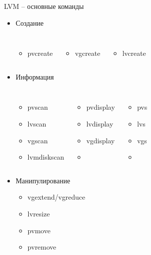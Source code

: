 \begin{frame}{LVM -- основные команды}
  \begin{itemize}
    \item Создание
      \begin{columns}
        \begin{itemize}
          \item pvcreate
        \end{itemize}
        \begin{itemize}
          \item vgcreate
        \end{itemize}
        \begin{itemize}
          \item lvcreate
        \end{itemize}
      \end{columns}
     \item Информация 
       \begin{columns}
         \begin{itemize}
           \item pvscan
           \item lvscan
           \item vgscan
		   \item lvmdiskscan
         \end{itemize}
         \begin{itemize}
           \item pvdisplay
           \item lvdisplay
           \item vgdisplay
		   \item[ ]
         \end{itemize}
         \begin{itemize}
           \item pvs
           \item lvs
           \item vgs
		   \item[ ]
         \end{itemize}
	 \end{columns}
      \item Манипулирование
        \begin{itemize}
          \item vgextend/vgreduce
          \item lvresize
          \item pvmove
          \item pvremove
         \end{itemize}
     \end{itemize}
    
\end{frame}

